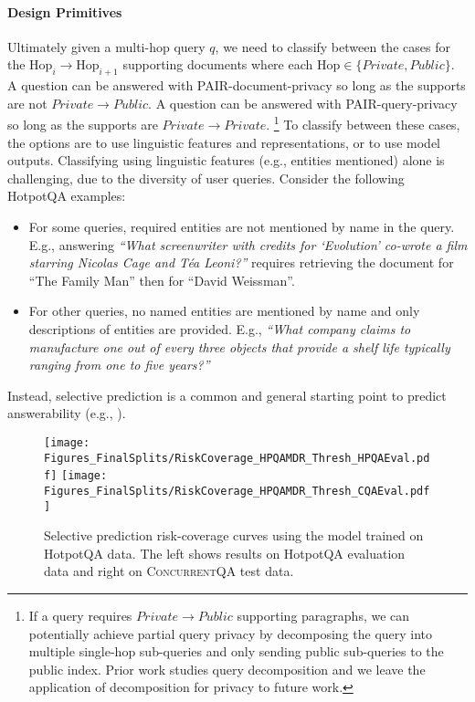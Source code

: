 \documentclass{article}
\renewcommand\cite{\citep}	\newcommand\shortcite{\citeyearpar}\newcommand\newcite{\citet}
\newcommand{\datasetname}{\textsc{ConcurrentQA}\xspace}
\newcommand{\problemshortname}{\textsc{PAIR}\xspace}
\begin{document}
\paragraph{Design Primitives}
 Ultimately given a multi-hop query $q$, we need to classify between the cases for the $\mathrm{Hop}_i \rightarrow \mathrm{Hop}_{i+1}$ supporting documents where each $\mathrm{Hop} \in \{Private, Public \}$. A question can be answered with \problemshortname-document-privacy so long as the supports are not $Private \rightarrow Public$. A question can be answered with \problemshortname-query-privacy so long as the supports are $Private \rightarrow Private$. \footnote{If a query requires $Private \rightarrow Public$ supporting paragraphs, we can potentially achieve partial query privacy by decomposing the query into multiple single-hop sub-queries and only sending public sub-queries to the public index. Prior work studies query decomposition \cite{min2019multihopdecomp, perez2020qadecomp, wolfson2020break} and we leave the application of decomposition for privacy to future work.}
 To classify between these cases, the options are to use linguistic features and representations, or to use model outputs. Classifying using linguistic features (e.g., entities mentioned) alone is challenging, due to the diversity of user queries. Consider the following HotpotQA examples:
\begin{itemize}
    \item For some queries, required entities are not mentioned by name in the query. E.g., answering \textit{``What screenwriter with credits for `Evolution' co-wrote a film starring Nicolas Cage and Téa Leoni?''} requires retrieving the document for ``The Family Man'' then for ``David Weissman''. 
    \item For other queries, no named entities are mentioned by name and only descriptions of entities are provided. E.g., \textit{``What company claims to manufacture one out of every three objects that provide a shelf life typically ranging from one to five years?''} 
\end{itemize}

Instead, selective prediction \cite{chow1975selectivepred, elyaniv2010selectivepred, geifman2017selectivepred} is a common and general starting point to predict answerability (e.g., \citet{rodriguez2019quizbowl, kamath2020selectiveqa, lewis2021paq}). 

\begin{figure}
    \centering
    \texttt{[image: Figures\_FinalSplits/RiskCoverage\_HPQAMDR\_Thresh\_HPQAEval.pdf]}
    \texttt{[image: Figures\_FinalSplits/RiskCoverage\_HPQAMDR\_Thresh\_CQAEval.pdf]}
    \caption[width=0.9\linewidth]{Selective prediction risk-coverage curves using the model trained on HotpotQA data. The left shows results on HotpotQA evaluation data and right on \datasetname test data.} 
    \label{fig:callibration}
\end{figure}
\end{document}
